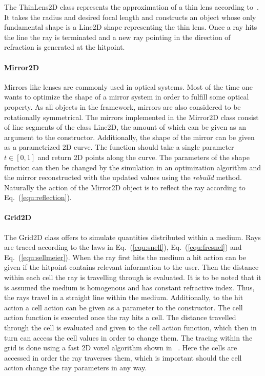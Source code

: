 \documentclass[a4paper,10pt]{article}
\newcommand{\equref}[1]{Eq.~(\ref{#1})}
\begin{document}
    The ThinLens2D class represents the approximation of a thin lens
    according to~\cite{thin_lens}.
    It takes the radius and desired focal length and constructs
    an object whose only fundamental shape is a Line2D shape representing
    the thin lens.
    Once a ray hits the line the ray is terminated and a new ray pointing
    in the direction of refraction is generated at the hitpoint.

    \paragraph{Mirror2D}

    Mirrors like lenses are commonly used in optical systems.
    Most of the time one wants to optimize the shape of a mirror system
    in order to fulfill some optical property.
    As all objects in the framework, mirrors are also considered to be
    rotationally symmetrical.
    The mirrors implemented in the Mirror2D class consist of line segments
    of the class Line2D, the amount of which can be given as an argument
    to the constructor.
    Additionally, the shape of the mirror can be given as a parametrized
    2D curve.
    The function should take a single parameter $t \in [0, 1]$ and return
    2D points along the curve.
    The parameters of the shape function can then be changed by the simulation
    in an optimization algorithm and the mirror reconstructed with the
    updated values using the \emph{rebuild} method.
    Naturally the action of the Mirror2D object is to reflect the ray
    according to \equref{equ:reflection}.
    
    \paragraph{Grid2D}

    The Grid2D class offers to simulate quantities distributed within
    a medium.
    Rays are traced according to the laws in \equref{equ:snell},
    \equref{equ:fresnel} and \equref{equ:sellmeier}.
    When the ray first hits the medium a hit action can be given if
    the hitpoint contains relevant information to the user.
    Then the distance within each cell the ray is travelling through
    is evaluated.
    It is to be noted that it is assumed the medium is homogenous and
    has constant refractive index.
    Thus, the rays travel in a straight line within the medium.
    Additionally, to the hit action a cell action can be given as a
    parameter to the constructor.
    The cell action function is executed once the ray hits a cell.
    The distance travelled through the cell is evaluated and given to the
    cell action function, which then in turn can access the cell
    values in order to change them.
    The tracing within the grid is done using a fast 2D voxel algorithm
    shown in ~\cite{voxel}.
    Here the cells are accessed in order the ray traverses them, which
    is important should the cell action change the ray parameters in
    any way.
    
\end{document}
